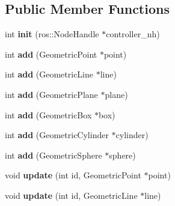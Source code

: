 \subsection*{Public Member Functions}
\begin{DoxyCompactItemize}
\item 
\hypertarget{classhiqp_1_1ROSVisualizer_a942a1082ce52a9831c40003667cabca5}{int {\bfseries init} (ros\-::\-Node\-Handle $\ast$controller\-\_\-nh)}\label{classhiqp_1_1ROSVisualizer_a942a1082ce52a9831c40003667cabca5}

\item 
\hypertarget{classhiqp_1_1ROSVisualizer_a554645f9016beb3a8471a8d61e5d9af1}{int {\bfseries add} (Geometric\-Point $\ast$point)}\label{classhiqp_1_1ROSVisualizer_a554645f9016beb3a8471a8d61e5d9af1}

\item 
\hypertarget{classhiqp_1_1ROSVisualizer_af3869b854ab72ef82ea0f96acd07f056}{int {\bfseries add} (Geometric\-Line $\ast$line)}\label{classhiqp_1_1ROSVisualizer_af3869b854ab72ef82ea0f96acd07f056}

\item 
\hypertarget{classhiqp_1_1ROSVisualizer_a1f3ce8e21494916060fb6b7d8f328717}{int {\bfseries add} (Geometric\-Plane $\ast$plane)}\label{classhiqp_1_1ROSVisualizer_a1f3ce8e21494916060fb6b7d8f328717}

\item 
\hypertarget{classhiqp_1_1ROSVisualizer_a0dab1fa740a8f29cded1299dc901476b}{int {\bfseries add} (Geometric\-Box $\ast$box)}\label{classhiqp_1_1ROSVisualizer_a0dab1fa740a8f29cded1299dc901476b}

\item 
\hypertarget{classhiqp_1_1ROSVisualizer_ab79b7a9a546c8258b7705e2170c5a6b0}{int {\bfseries add} (Geometric\-Cylinder $\ast$cylinder)}\label{classhiqp_1_1ROSVisualizer_ab79b7a9a546c8258b7705e2170c5a6b0}

\item 
\hypertarget{classhiqp_1_1ROSVisualizer_ada15c36e1a0f241b2869bf81e2da2afe}{int {\bfseries add} (Geometric\-Sphere $\ast$sphere)}\label{classhiqp_1_1ROSVisualizer_ada15c36e1a0f241b2869bf81e2da2afe}

\item 
\hypertarget{classhiqp_1_1ROSVisualizer_a8c04c3c3eb169738f1e0f1b7beed5745}{void {\bfseries update} (int id, Geometric\-Point $\ast$point)}\label{classhiqp_1_1ROSVisualizer_a8c04c3c3eb169738f1e0f1b7beed5745}

\item 
\hypertarget{classhiqp_1_1ROSVisualizer_ad28ab7953d60646399ef60aaf0f1e3fc}{void {\bfseries update} (int id, Geometric\-Line $\ast$line)}\label{classhiqp_1_1ROSVisualizer_ad28ab7953d60646399ef60aaf0f1e3fc}


\end{DoxyCompactItemize}

